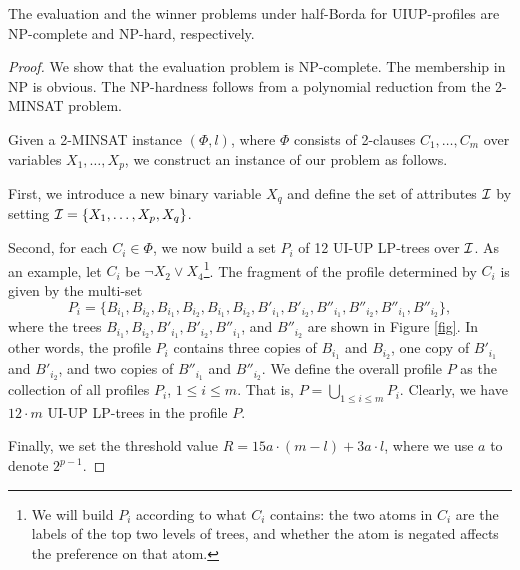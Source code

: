 \begin{thm}
\label{thm:thm5}
	The evaluation and the winner problems under half-Borda for UIUP-profiles are 
	NP-complete and NP-hard, respectively.
\end{thm}
\begin{proof}
We show that the evaluation problem is NP-complete. The membership
in NP is obvious. The NP-hardness follows from a polynomial reduction 
from the 2-MINSAT problem.

Given a 2-MINSAT instance $(\Phi,l)$, where $\Phi$ consists of 2-clauses 
$C_1,\ldots,C_m$ over variables $X_1,\ldots,X_p$, we construct an 
instance of our problem as follows.
	
First, we introduce a new binary variable $X_q$ and define the set of
attributes $\mathcal{I}$ by setting $\mathcal{I}=\{X_1,\ldots, X_p,X_q\}$. 

Second, for each $C_i \in \Phi$, we now build a set $P_i$ of 12 UI-UP 
LP-trees over $\mathcal{I}$.
As an example, let $C_i$ be $\neg X_2 \lor X_4$\footnote{
	We will build $P_i$ according to what $C_i$ contains:
	the two atoms in $C_i$ are the labels of the top two levels of trees,
	and whether the atom is negated affects the preference on that atom.
}.
The fragment of the profile determined by $C_i$ is given by the multi-set 
\[
P_i= \{ B_{i_1},B_{i_2},B_{i_1},B_{i_2},B_{i_1},B_{i_2}, 
B'_{i_1},B'_{i_2},
B''_{i_1},B''_{i_2},B''_{i_1},B''_{i_2}\},
\]
where the trees $B_{i_1}, B_{i_2},B'_{i_1}, B'_{i_2},B''_{i_1}$, and 
$B''_{i_2}$ are shown in Figure \ref{fig}.
In other words, the profile $P_i$ contains three copies of $B_{i_1}$
and $B_{i_2}$, one copy of $B'_{i_1}$ and $B'_{i_2}$, and two copies of
$B''_{i_1}$ and $B''_{i_2}$. We define the overall profile $P$ as the 
collection of all profiles $P_i$, $1\leq i\leq m$. That is,
$P=\bigcup_{1\leq i \leq m} P_i$. Clearly, we have $12\cdot m$ 
UI-UP LP-trees in the profile $P$.

Finally, we set the threshold value $R=15a\cdot (m-l)+3a\cdot l$, where we use
$a$ to denote $2^{p-1}$.


\end{proof}
